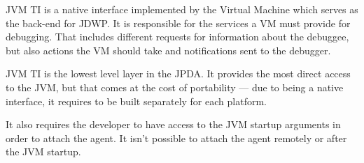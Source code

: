 \documentclass[..thesis.tex]{subfiles}
\begin{document}
JVM TI is a native interface implemented by the Virtual Machine which serves as the back-end for JDWP.
It is responsible for the services a VM must provide for debugging.
That includes different requests for information about the debuggee, but also actions the VM should take and notifications sent to the debugger.\cite{oracle_jpda_jvmti}

JVM TI is the lowest level layer in the JPDA. 
It provides the most direct access to the JVM, but that comes at the cost of portability --- due to being a native interface, it requires to be built separately for each platform.

It also requires the developer to have access to the JVM startup arguments in order to attach the agent. It isn't possible to attach the agent remotely or after the JVM startup.
\end{document}
